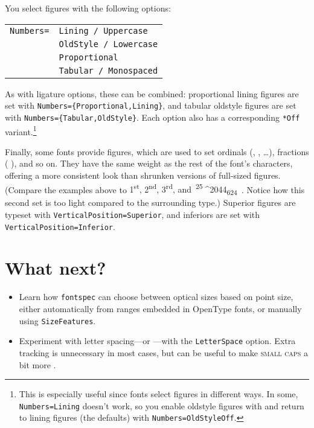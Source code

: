 You select figures with the following options:
\begin{leftfigure}
\begin{tabular}{l l}
\texttt{Numbers=} & \texttt{Lining / Uppercase} \\
 & \texttt{OldStyle / Lowercase} \\
 & \texttt{Proportional} \\
 & \texttt{Tabular / Monospaced}
\end{tabular}
\end{leftfigure}
As with ligature options, these can be combined:
proportional lining figures are set
with \texttt{Numbers=\allowbreak\{Proportional,\allowbreak Lining\}},
and tabular oldstyle figures are set with
\texttt{Numbers=\allowbreak\{Tabular,\allowbreak OldStyle\}}.
Each option also has a corresponding \verb|*Off|
variant.\punckern\footnote{This is especially useful since fonts
select figures in different ways.
In some, \texttt{Numbers=\allowbreak Lining} doesn't work,
so you enable oldstyle figures with 
and return to lining figures (the defaults) with
\texttt{Numbers=\allowbreak OldStyleOff}.}

Finally, some fonts provide  figures,
which are used to set ordinals
(,  , \dots),
fractions (\,\,), and so on.
They have the same weight as the rest of the font's characters,
offering a more consistent look than shrunken versions of full-sized figures.
(Compare the examples above to
{%
\mbox{1\textsuperscript{st}},
\mbox{2\textsuperscript{nd}},
\mbox{3\textsuperscript{rd}},
and
\,\mbox{\textsuperscript{25}^^^^2044\textsubscript{624}}%
\,}.
Notice how this second set is too light compared to the surrounding
type.)
Superior figures are typeset with
\texttt{VerticalPosition=\allowbreak Superior},
and inferiors are set with \texttt{VerticalPosition=\allowbreak Inferior}.

\section{What next?}
\begin{itemize}
\item Learn how \texttt{fontspec} can choose between optical sizes based on
    point size, either automatically from ranges embedded in OpenType fonts,
    or manually using \texttt{SizeFeatures}.
\item Experiment with letter spacing---or ---with
    the \texttt{LetterSpace} option.
    Extra tracking is unnecessary in most cases,
    but can be useful to make \textsc{small caps}
    a bit more .
\end{itemize}
